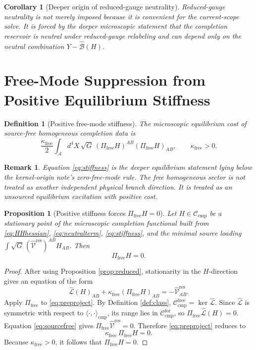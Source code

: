 \documentclass[11pt]{article}
\newcommand{\Sub}{\mathcal A}
\newcommand{\ResidualLift}{\widehat{\mathcal V}^{\mathrm{res}}}
\newcommand{\SubGaugeVec}{\widehat{\mathcal B}}
\newcommand{\SubReducedEin}{\widehat{\mathcal L}}
\newcommand{\FreeProj}{\Pi_{\mathrm{free}}}
\newcommand{\GaugeAux}{Y}
\newcommand{\CompClass}{\mathscr C_{\mathrm{cmp}}}
\newcommand{\CompFree}{\mathscr C_{\mathrm{cmp}}^{\mathrm{free}}}
\newcommand{\CompForced}{\mathscr C_{\mathrm{cmp}}^{\mathrm{for}}}
\newcommand{\FreeStiff}{\kappa_{\mathrm{free}}}
\newtheorem{definition}{Definition}
\newtheorem{proposition}{Proposition}
\newtheorem{remark}{Remark}
\newtheorem{corollary}{Corollary}
\begin{document}
\begin{corollary}[Deeper origin of reduced-gauge neutrality]
\label{cor:neutral}
Reduced-gauge neutrality is not merely imposed because it is convenient for the current-scope solve. It is forced by the deeper microscopic statement that the completion reservoir is neutral under reduced-gauge relabeling and can depend only on the neutral combination \(\GaugeAux-\SubGaugeVec(H)\).
\end{corollary}

\section{Free-Mode Suppression from Positive Equilibrium Stiffness}

\begin{definition}[Positive free-mode stiffness]
\label{def:stiff}
The microscopic equilibrium cost of source-free homogeneous completion data is
\begin{equation}
\frac{\FreeStiff}{2}
\int_{\Sub} d^4X\,\sqrt{G}\,
(\FreeProj H)^{AB}(\FreeProj H)_{AB},
\qquad
\FreeStiff>0.
\label{eq:stiffness}
\end{equation}
\end{definition}

\begin{remark}
Equation \eqref{eq:stiffness} is the deeper equilibrium statement lying below the kernel-origin note's zero-free-mode rule. The free homogeneous sector is not treated as another independent physical branch direction. It is treated as an unsourced equilibrium excitation with positive cost.
\end{remark}

\begin{proposition}[Positive stiffness forces \(\FreeProj H=0\)]
\label{prop:stiffzero}
Let \(H\in\CompClass\) be a stationary point of the microscopic completion functional built from \eqref{eq:HHhessian}, \eqref{eq:neutralterm}, \eqref{eq:stiffness}, and the minimal source loading \(\int \sqrt{G}\,(\ResidualLift)^{AB}H_{AB}\). Then
\begin{equation}
\FreeProj H=0.
\label{eq:freezero}
\end{equation}
\end{proposition}

\begin{proof}
After using Proposition \ref{prop:reduced}, stationarity in the \(H\)-direction gives an equation of the form
\begin{equation}
\SubReducedEin(H)_{AB}
+\FreeStiff(\FreeProj H)_{AB}
=
-\ResidualLift_{AB}.
\label{eq:preproject}
\end{equation}
Apply \(\FreeProj\) to \eqref{eq:preproject}. By Definition \ref{def:class}, \(\CompFree=\ker\SubReducedEin\). Since \(\SubReducedEin\) is symmetric with respect to \(\langle\cdot,\cdot\rangle_{\mathrm{cmp}}\), its range lies in \(\CompForced\), so \(\FreeProj\SubReducedEin(H)=0\). Equation \eqref{eq:sourcefree} gives \(\FreeProj\ResidualLift=0\). Therefore \eqref{eq:preproject} reduces to
\[
\FreeStiff\,\FreeProj H=0.
\]
Because \(\FreeStiff>0\), it follows that \(\FreeProj H=0\).
\end{proof}
\end{document}
